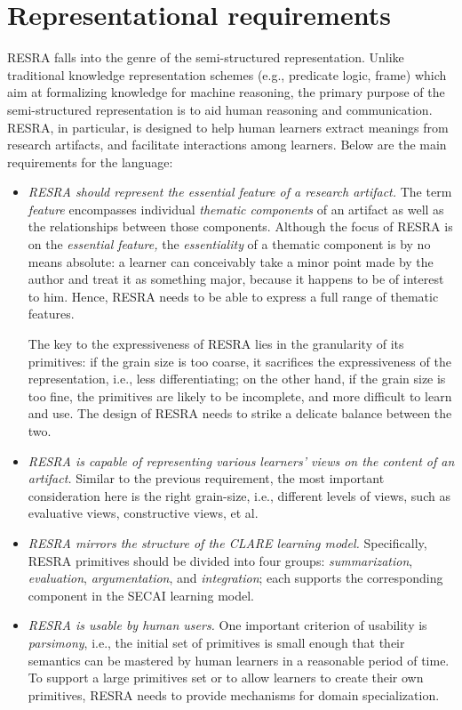 \section{Representational requirements}
\label{sec:c3-design}

RESRA falls into the genre of the semi-structured representation.  Unlike
traditional knowledge representation schemes (e.g., predicate logic, frame)
which aim at formalizing knowledge for machine reasoning, the primary
purpose of the semi-structured representation is to aid human reasoning and
communication. RESRA, in particular, is designed to help human learners
extract meanings from research artifacts, and facilitate interactions among
learners. Below are the main requirements for the language:

\begin{itemize}
\item {\it RESRA should represent the essential feature of a research
  artifact.\/} The term {\it feature\/} encompasses individual {\it
  thematic components\/} of an artifact as well as the relationships
  between those components. Although the focus of RESRA is on the {\it
  essential feature,\/} the {\it essentiality\/} of a thematic component
  is by no means absolute: a learner can conceivably take a minor point
  made by the author and treat it as something major, because it happens
  to be of interest to him.  Hence, RESRA needs to be able to express a
  full range of thematic features.
  
  The key to the expressiveness of RESRA lies in the granularity of its
  primitives: if the grain size is too coarse, it sacrifices the
  expressiveness of the representation, i.e., less differentiating; on
  the other hand, if the grain size is too fine, the primitives are
  likely to be incomplete, and more difficult to learn and use. The
  design of RESRA needs to strike a delicate balance between the two.
  
\item {\it RESRA is capable of representing various learners' views on
  the content of an artifact.\/} Similar to the previous requirement, the
  most important consideration here is the right grain-size, i.e.,
  different levels of views, such as evaluative views, constructive views,
  et al.
  
\item {\it RESRA mirrors the structure of the CLARE learning model.\/}
  Specifically, RESRA primitives should be divided into four groups: {\it
  summarization\/}, {\it evaluation\/}, {\it argumentation\/}, and {\it
  integration\/}; each supports the corresponding component in the SECAI
  learning model.
  
\item {\it RESRA is usable by human users.\/} One important criterion
  of usability is {\it parsimony\/}, i.e., the initial set of primitives
  is small enough that their semantics can be mastered by human learners
  in a reasonable period of time. To support a large primitives set or to
  allow learners to create their own primitives, RESRA needs to provide
  mechanisms for domain specialization.
\end{itemize}

